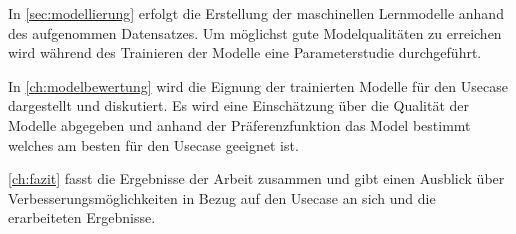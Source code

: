 In \cref{sec:modellierung} erfolgt die Erstellung der maschinellen Lernmodelle anhand des aufgenommen Datensatzes. Um möglichst gute Modelqualitäten zu erreichen wird während des Trainieren der Modelle eine Parameterstudie durchgeführt.

In \cref{ch:modelbewertung} wird die Eignung der trainierten Modelle für den Usecase dargestellt und diskutiert. Es wird eine Einschätzung über die Qualität der Modelle abgegeben und anhand der Präferenzfunktion das Model bestimmt welches am besten für den Usecase geeignet ist.

\cref{ch:fazit} fasst die Ergebnisse der Arbeit zusammen und gibt einen Ausblick über Verbesserungsmöglichkeiten in Bezug auf den Usecase an sich und die erarbeiteten Ergebnisse.